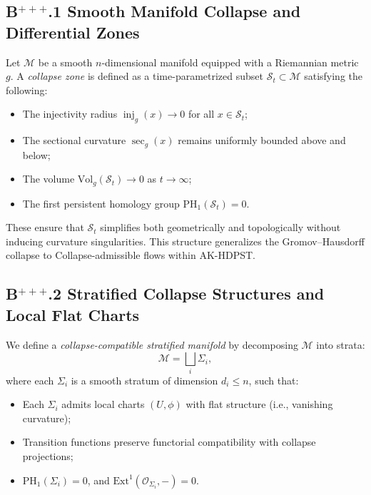 \documentclass[11pt]{article}
\begin{document}
\subsection*{B$^{+++}$.1 Smooth Manifold Collapse and Differential Zones}

Let \( \mathcal{M} \) be a smooth \( n \)-dimensional manifold equipped with a Riemannian metric \( g \). A \emph{collapse zone} is defined as a time-parametrized subset \( \mathcal{S}_t \subset \mathcal{M} \) satisfying the following:

\begin{itemize}
  \item The injectivity radius \( \operatorname{inj}_g(x) \to 0 \) for all \( x \in \mathcal{S}_t \);
  \item The sectional curvature \( \sec_g(x) \) remains uniformly bounded above and below;
  \item The volume \( \mathrm{Vol}_g(\mathcal{S}_t) \to 0 \) as \( t \to \infty \);
  \item The first persistent homology group \( \mathrm{PH}_1(\mathcal{S}_t) = 0 \).
\end{itemize}

These ensure that \( \mathcal{S}_t \) simplifies both geometrically and topologically without inducing curvature singularities. This structure generalizes the Gromov--Hausdorff collapse to Collapse-admissible flows within AK-HDPST.

\subsection*{B$^{+++}$.2 Stratified Collapse Structures and Local Flat Charts}

We define a \emph{collapse-compatible stratified manifold} by decomposing \( \mathcal{M} \) into strata:
\[ \mathcal{M} = \bigsqcup_{i} \Sigma_i, \]
where each \( \Sigma_i \) is a smooth stratum of dimension \( d_i \leq n \), such that:

\begin{itemize}
  \item Each \( \Sigma_i \) admits local charts \( (U, \phi) \) with flat structure (i.e., vanishing curvature);
  \item Transition functions preserve functorial compatibility with collapse projections;
  \item \( \mathrm{PH}_1(\Sigma_i) = 0 \), and \( \mathrm{Ext}^1(\mathcal{O}_{\Sigma_i}, -) = 0 \).
\end{itemize}
\end{document}
